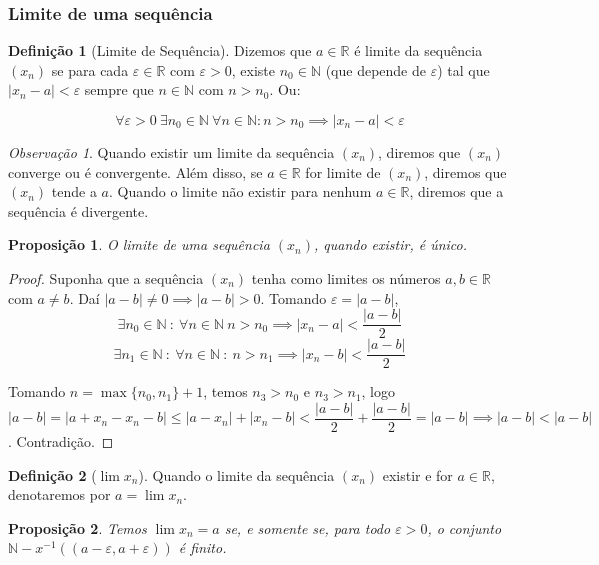 \documentclass{article}
\newtheorem{prop}{Proposição}[section]
\theoremstyle{theorem}
\theoremstyle{lemma}
\theoremstyle{definition}
\newtheorem{definicao}{Definição}[section]
\theoremstyle{remark}
\newtheorem{obs}{Observação}[section]
\begin{document}
   \subsubsection{ Limite de uma sequência}
   \begin{definicao}[Limite de Sequência]
	   Dizemos que $a\in \mathbb{R}$ é limite da sequência $(x_n)$ se para cada $\varepsilon\in \mathbb{R}$ com $\varepsilon > 0$, existe $n_0 \in \mathbb{N}$ (que depende de $\varepsilon$) tal que $|x_n - a| < \varepsilon$ sempre que $n\in \mathbb{N}$ com $n>n_0$. Ou:

	   $$ \forall \varepsilon >0 \:  \exists n_0 \in \mathbb{N}\: \forall n \in \mathbb{N} : n> n_0 \implies |x_n -a| < \varepsilon$$
   \end{definicao}
   \begin{obs}
	   Quando existir um limite da sequência $(x_n)$, diremos que $(x_n)$ converge ou é convergente. Além disso, se $a\in \mathbb{R}$ for limite de $(x_n)$, diremos que $(x_n)$ tende a $a$. 
	   Quando o limite não existir para nenhum $a\in \mathbb{R}$, diremos que a sequência é divergente.
   \end{obs}
   \begin{prop}
	   O limite de uma sequência $(x_n)$, quando existir, é único.
   \end{prop}
   \begin{proof}
	   Suponha que a sequência $(x_n)$ tenha como limites os números $a,b\in \mathbb{R}$ com $a\neq b$. Daí $|a-b| \neq 0 \implies |a-b| > 0$. Tomando $\varepsilon = |a-b|$, 
	   $$ \exists n_0\in \mathbb{N} \: : \: \forall n \in \mathbb{N} \: n > n_0 \implies |x_n - a| < \dfrac{|a-b|}{2}$$ 
	   $$ \exists n_1 \in \mathbb{N} \: : \: \forall n \in \mathbb{N} \: : \: n > n_1 \implies |x_n -b| < \dfrac{|a-b|}{2}$$

	   Tomando $n = \max\{n_0 , n_1\} +1$, temos $n_3>n_0$ e $n_3 > n_1$, logo $|a-b| = |a+x_{n} -x_n -b | \leq |a-x_n| + |x_n - b|< \dfrac{|a-b|}{2} + \dfrac{|a-b|}{2}  = |a-b| \implies |a-b| < |a-b|$. Contradição.
   \end{proof}
   \begin{definicao}[$\lim x_n$]
	   Quando o limite da sequência $(x_n)$ existir e for $a\in \mathbb{R}$, denotaremos por $a = \lim x_n$.
   \end{definicao}
\begin{prop}
	Temos $\lim x_n = a$ se, e somente se, para todo $\varepsilon>0$,  o conjunto $\mathbb{N} - x^{-1}( (a - \varepsilon, a+\varepsilon))$ é finito.
\end{prop}
\end{document}

